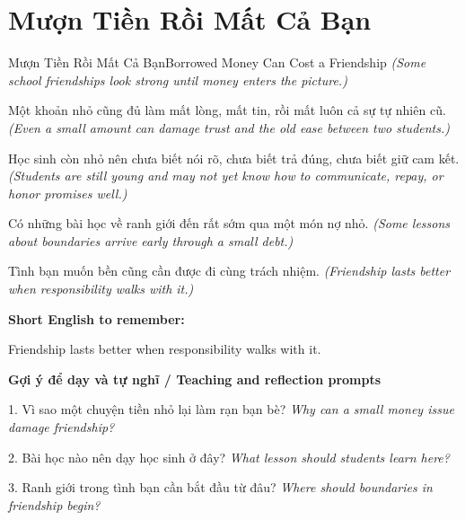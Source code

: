\section{Mượn Tiền Rồi Mất Cả Bạn}
\begin{truyen}{Mượn Tiền Rồi Mất Cả Bạn}{Borrowed Money Can Cost a Friendship}
\textit{(Some school friendships look strong until money enters the picture.)}

Một khoản nhỏ cũng đủ làm mất lòng, mất tin, rồi mất luôn cả sự tự nhiên cũ.
\textit{(Even a small amount can damage trust and the old ease between two students.)}

Học sinh còn nhỏ nên chưa biết nói rõ, chưa biết trả đúng, chưa biết giữ cam kết.
\textit{(Students are still young and may not yet know how to communicate, repay, or honor promises well.)}

Có những bài học về ranh giới đến rất sớm qua một món nợ nhỏ.
\textit{(Some lessons about boundaries arrive early through a small debt.)}

\end{truyen}

\begin{baihoc}
Tình bạn muốn bền cũng cần được đi cùng trách nhiệm.
\textit{(Friendship lasts better when responsibility walks with it.)}
\end{baihoc}

\begin{ghinhoanh}
\textbf{Short English to remember:}

Friendship lasts better when responsibility walks with it.

\end{ghinhoanh}

\begin{tuhocnhanh}
\textbf{Gợi ý để dạy và tự nghĩ / Teaching and reflection prompts}

1. Vì sao một chuyện tiền nhỏ lại làm rạn bạn bè? \textit{Why can a small money issue damage friendship?}

2. Bài học nào nên dạy học sinh ở đây? \textit{What lesson should students learn here?}

3. Ranh giới trong tình bạn cần bắt đầu từ đâu? \textit{Where should boundaries in friendship begin?}
\end{tuhocnhanh}
\ngancach

